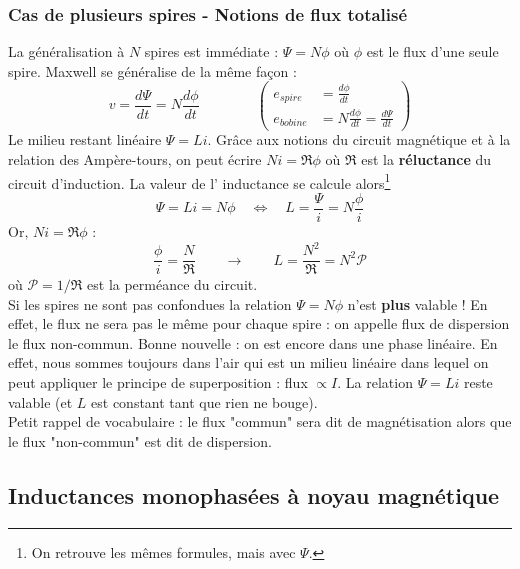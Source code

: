 		\subsubsection{Cas de plusieurs spires - Notions de flux 
		totalisé}
		La généralisation à $N$ spires est immédiate : $\Psi = 
		N\phi$ où $\phi$ est le flux d'une seule spire. Maxwell 
		se généralise de la même façon :
		\begin{equation}
		v = \frac{d\Psi}{dt} = N\frac{d\phi}{dt}\qquad\qquad\left(
		\begin{array}{ll}
		e_{spire} &= \frac{d\phi}{dt}\\
		e_{bobine} &= N\frac{d\phi}{dt} = \frac{d\Psi}{dt}
		\end{array}\right)
		\end{equation}
		Le milieu restant linéaire $\Psi = Li$. Grâce aux notions 
		du circuit magnétique et à la relation des Ampère-tours, on 
		peut écrire $Ni = \mathfrak{R}\phi$ où $\mathfrak{R}$ est la 
		\textbf{réluctance} du circuit d'induction. La valeur de l'
		inductance se calcule alors\footnote{On retrouve les mêmes formules, 
		mais avec $\Psi$.}
		\begin{equation}
		\Psi = Li = N\phi\quad \Leftrightarrow\quad L = \dfrac{\Psi}{i} = 
		N\dfrac{\phi}{i}
		\end{equation}
		$\text{Or, } Ni=\mathfrak{R}\phi$ :
		\begin{equation}
		\dfrac{\phi}{i} = \dfrac{N}{\mathfrak{R}}\qquad\longrightarrow\qquad 
		L = \frac{N^2}{\mathfrak{R}} 
		= N^2 \mathcal{P}
		\end{equation}
		où $\mathcal{P} = 1/\mathfrak{R}$ est la perméance du circuit. \\
		\danger Si les spires ne sont pas confondues la 
		relation $\Psi = N\phi$ n'est \textbf{plus} valable ! En effet, 
		le flux ne sera pas le même pour chaque spire : on appelle 
		flux de dispersion le flux non-commun. Bonne nouvelle : on est 
		encore dans une phase linéaire. En effet, nous sommes toujours 
		dans l'air qui est un milieu linéaire dans lequel on peut appliquer 
		le principe de superposition : flux $\propto I$. La relation  
		$\Psi = Li$ reste valable (et $L$ est constant tant que rien ne bouge).\\
		
		Petit rappel de vocabulaire : le flux "commun" sera dit de magnétisation 
		alors que le flux "non-commun" est dit de dispersion.		
		
		
	\subsection{Inductances monophasées à noyau magnétique}		
